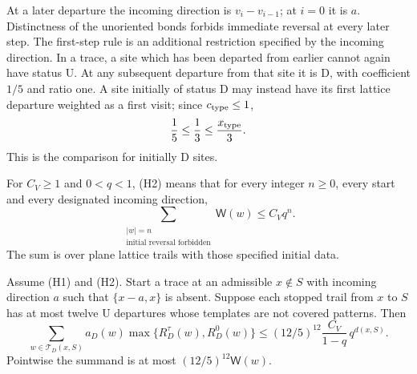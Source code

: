 At a later departure the incoming direction is
\(v_i-v_{i-1}\); at \(i=0\) it is \(a\).
Distinctness of the unoriented bonds forbids immediate reversal
at every later step. The first-step rule is an additional
restriction specified by the incoming direction.
In a trace, a site which has been departed from earlier cannot
again have status \(\mathrm U\). At any subsequent departure
from that site it is \(\mathrm D\), with coefficient \(1/5\)
and ratio one. A site initially of status \(\mathrm D\) may
instead have its first lattice departure weighted as a first
visit; since \(c_{\rm type}\le1\),
\[
 \frac15\le\frac13\le\frac{x_{\rm type}}3.
\]
This is the comparison for initially \(\mathrm D\) sites.

\begin{definition}[(H2)]\label{h:H2}
For \(C_V\ge1\) and \(0<q<1\), (H2) means that for every
integer \(n\ge0\), every start and every designated incoming direction,
\[
 \sum_{\substack{|w|=n\\\text{initial reversal forbidden}}}
                      \mathsf W(w)\le C_Vq^n .
\]
The sum is over plane lattice trails with those specified initial data.
\end{definition}


\begin{lemma}\label{l:onepoint}
Assume (H1) and (H2). Start a trace at an admissible \(x\notin S\)
with incoming direction \(a\) such that \(\{x-a,x\}\) is absent.
Suppose each stopped trail from \(x\) to \(S\) has at most twelve
\(\mathrm U\) departures whose templates are not covered patterns.
Then
\[
 \sum_{w\in\mathcal T_D(x,S)}a_D(w)
                  \max\{R_D^\tau(w),R_D^0(w)\}
 \le (12/5)^{12}\frac{C_V}{1-q}\,q^{d(x,S)}.
\]
Pointwise the summand is at most \((12/5)^{12}\mathsf W(w)\).
\end{lemma}

